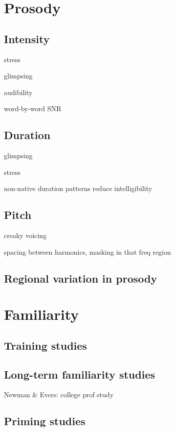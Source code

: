 \section{Prosody}

\subsection{Intensity}
\begin{itm}
	\item{stress}
	\item{glimpsing}
	\item{audibility}
	\item{word-by-word SNR}
\end{itm}

\subsection{Duration}
\begin{itm}
	\item{glimpsing}
	\item{stress}
	\item{non-native duration patterns reduce intelligibility\citep{QueneVanDelft2010}}
\end{itm}

\subsection{Pitch}
\begin{itm}
	\item{creaky voicing}
	\item{spacing between harmonics, masking in that freq region}
\end{itm}

\subsection{Regional variation in prosody}

\section{Familiarity}
\subsection{Training studies}
\subsection{Long-term familiarity studies}
Newman \& Evers: college prof study\citep{NewmanEvers2007}

\subsection{Priming studies}
